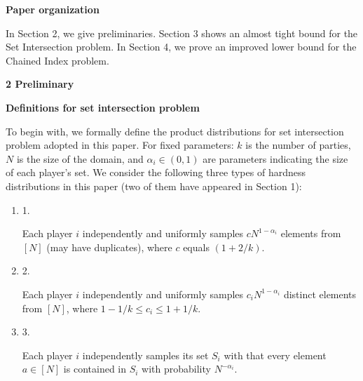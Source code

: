 \par\medskip\noindent\textbf{Paper organization}\par




In Section 2, we give preliminaries. Section 3 shows an almost tight bound for the Set Intersection problem. In Section 4, we prove an improved lower bound for the Chained Index problem.\par







\par\medskip\noindent\textbf{
2 Preliminary}\par




\par\medskip\noindent\textbf{Definitions for set intersection problem}\par




To begin with, we formally define the product distributions for set intersection problem adopted in this paper. For fixed parameters: $k$ is the number of parties, $N$ is the size of the domain, and $\alpha_{i}\in(0,1)$ are parameters indicating the size of each player’s set. We consider the following three types of hardness distributions in this paper (two of them have appeared in Section 1):\par


\begin{enumerate}


\item[] 
1. 


Each player $i$ independently and uniformly samples $cN^{1-\alpha_{i}}$ elements from $[N]$ (may have duplicates), where $c$ equals $(1+2/k)$.\par





\item[] 
2. 


Each player $i$ independently and uniformly samples $c_{i}N^{1-\alpha_{i}}$ distinct elements from $[N]$, where $1-1/k\leq c_{i}\leq 1+1/k$.\par





\item[] 
3. 


Each player $i$ independently samples its set $S_{i}$ with that every element $a\in[N]$ is contained in $S_{i}$ with probability $N^{-\alpha_{i}}$.\par





\end{enumerate}


